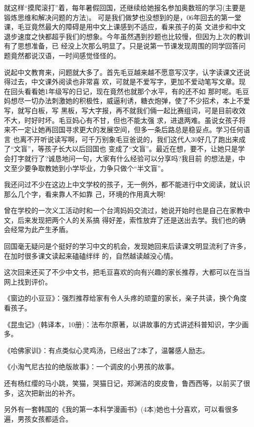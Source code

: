 \documentclass[11pt,a4paper,onecolumn]{article}
\begin{document}
就这样``摸爬滚打''着，每年暑假回国，还继续给她报名参加奥数班的学习(主要是锻炼思维和解决问题的方法)。
可是我们做梦也没想到的是，06年回去的第一堂课，毛豆竟然最大的障碍是用中文上课感到不适应，看来孩子的英
文进步和中文退步速度之快都超乎我们的想象。今年虽然遇到抄题也比较慢，但因为上次的教训有了思想准备，已
经没上次那么明显了。只是说第一节课发现周围的同学回答问题竟然都说汉语，一时间感觉怪怪的。


说起中文教育来，问题就大多了。首先毛豆越来越不愿意写汉字，认字读课文还说得过去，中文课外阅读也非常喜
欢，可就是不爱写字，更加不爱动笔写文章。现在回头看看她1年级写的日记，现在竟然也就那个水平，有的还不如
那时呢。毛豆妈想尽一切办法刺激她的积极性，威逼利诱，糖衣炮弹，使了不少招术，本上不爱写，就写白板，写
黑板，写大字报，再不就我们倆一起比赛组词，可是目前收效不大，时好时坏。毛豆妈心有不甘，但也不能太强
求，进退两难。虽说女孩子将来不一定让她再回国寻求更大的发展空间，但多一条后路总是稳妥点。学习任何语言
也离不开听说读写啊，可千万别象毛豆爸说的，我们这代人30好几了跑出来成了``文盲''，等孩子长大以后回国也
变成了``文盲''。最近在想，要不，让她只是学会打字就行了?诚恳地问一句，大家有什么经验可以分享吗?我目前
的想法是，中文至少要争取教她到小学毕业，力争只做个``半文盲''。


我还问过不少在这边上中文学校的孩子，无一例外，都不能进行中文阅读，就认识那么几个字，看来靠人不如靠
己，环境的作用真大啊!


曾在学校的一次义工活动时和一个台湾妈妈交流过，她说开始时也是自己在家教中文，后来发现把两个人的关系搞
得好差，索性放弃了还是送出去学。我们也的确会经常为此产生矛盾。


回国毫无疑问是个挺好的学习中文的机会，发现她回来后读课文明显流利了许多，在加时很多课文读起来磕磕绊绊
的，自然越读越没心情。

这次回来还买了不少中文书，把毛豆喜欢的向有兴趣的家长推荐，大都可以在当当网上找到评价。

《窗边的小豆豆》：强烈推荐给家有令人头疼的顽童的家长，亲子共读，换个角度看孩子。

《昆虫记》(韩译本，10册)：法布尔原著，以讲故事的方式讲述科普知识，字少画多。

《哈佛家训》：有点类似心灵鸡汤，已经出了2本了，温馨感人励志。

《小淘气尼古拉的绝版故事》：一个调皮的小男孩的故事。

还有杨红缨的马小跳，笑猫，哭猫日记，郑渊洁的皮皮鲁，鲁西西等，以前买了很多，这次把新出的补齐。

另外有一套韩国的《我的第一本科学漫画书》(4本)她也十分喜欢，可以看很多遍，男孩女孩都适合。
\end{document}
